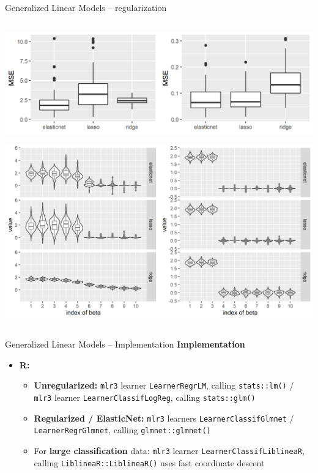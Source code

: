 \documentclass[11pt,compress,t,notes=noshow, xcolor=table]{beamer}
\newcommand{\highlight}[1]{\textcolor{hlcol}{\textbf{#1}}}
\begin{document}
\begin{frame2}{Generalized Linear Models -- regularization}
\begin{columns}[T, totalwidth=\textwidth]
\begin{column}{0.38\textwidth}
          \includegraphics[width=\textwidth]{figure/enet_lasso_ridge_mse.png}
          
          \includegraphics[width=\textwidth]{figure/enet_tradeoff.png}
\end{column}

\end{columns}
  
\end{frame2}


\begin{frame2}{Generalized Linear Models -- Implementation}
  \highlight{Implementation}

\begin{itemize}
  \item \textbf{R:}
  \begin{itemize}
    \item \textbf{Unregularized:} \texttt{mlr3} learner \texttt{LearnerRegrLM}, 
    calling \texttt{stats::lm()} / \texttt{mlr3} learner 
    \texttt{LearnerClassifLogReg}, calling \texttt{stats::glm()}
    \item \textbf{Regularized / ElasticNet:} \texttt{mlr3} learners 
    \texttt{LearnerClassifGlmnet} / 
    \texttt{LearnerRegrGlmnet}, calling \texttt{glmnet::glmnet()}
    \item For \textbf{large classification} data: \texttt{mlr3} learner     
    \texttt{LearnerClassifLiblineaR}, calling \texttt{LiblineaR::LiblineaR()} uses fast coordinate descent
  \end{itemize}
\end{itemize}
\end{frame2}
\end{document}
